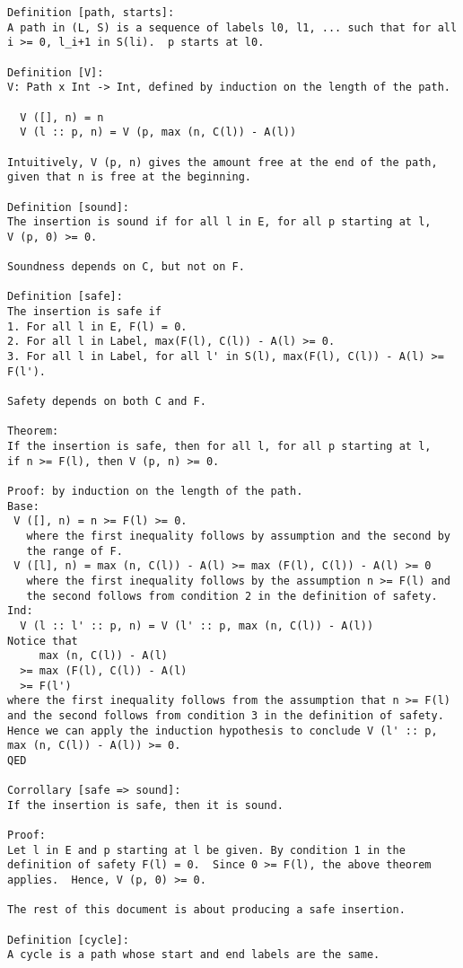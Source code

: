 \begin{verbatim}
Definition [path, starts]:
A path in (L, S) is a sequence of labels l0, l1, ... such that for all
i >= 0, l_i+1 in S(li).  p starts at l0.

Definition [V]:
V: Path x Int -> Int, defined by induction on the length of the path.

  V ([], n) = n
  V (l :: p, n) = V (p, max (n, C(l)) - A(l))

Intuitively, V (p, n) gives the amount free at the end of the path,
given that n is free at the beginning.

Definition [sound]:
The insertion is sound if for all l in E, for all p starting at l,
V (p, 0) >= 0.

Soundness depends on C, but not on F.

Definition [safe]:
The insertion is safe if
1. For all l in E, F(l) = 0.
2. For all l in Label, max(F(l), C(l)) - A(l) >= 0.
3. For all l in Label, for all l' in S(l), max(F(l), C(l)) - A(l) >= F(l').

Safety depends on both C and F.

Theorem:
If the insertion is safe, then for all l, for all p starting at l,
if n >= F(l), then V (p, n) >= 0.

Proof: by induction on the length of the path.
Base:
 V ([], n) = n >= F(l) >= 0.
   where the first inequality follows by assumption and the second by
   the range of F.
 V ([l], n) = max (n, C(l)) - A(l) >= max (F(l), C(l)) - A(l) >= 0
   where the first inequality follows by the assumption n >= F(l) and
   the second follows from condition 2 in the definition of safety.
Ind:
  V (l :: l' :: p, n) = V (l' :: p, max (n, C(l)) - A(l))
Notice that
     max (n, C(l)) - A(l)
  >= max (F(l), C(l)) - A(l)
  >= F(l')
where the first inequality follows from the assumption that n >= F(l)
and the second follows from condition 3 in the definition of safety.
Hence we can apply the induction hypothesis to conclude V (l' :: p,
max (n, C(l)) - A(l)) >= 0.
QED

Corrollary [safe => sound]:
If the insertion is safe, then it is sound.

Proof:
Let l in E and p starting at l be given. By condition 1 in the
definition of safety F(l) = 0.  Since 0 >= F(l), the above theorem
applies.  Hence, V (p, 0) >= 0.

The rest of this document is about producing a safe insertion.

Definition [cycle]:
A cycle is a path whose start and end labels are the same.


\end{verbatim}
